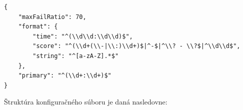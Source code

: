 \begin{lstlisting}[caption={Príklad konfiguračného súboru},captionpos=b,label={config_ex}]
{
    "maxFailRatio": 70,
    "format": {
        "time": "^(\\d\\d:\\d\\d)$",
        "score": "^(\\d+(\\-|\\:)\\d+)$|^-$|^\\? - \\?$|^\\d\\d$",
        "string": "^[a-zA-Z].*$"
    },
    "primary": "^(\\d+:\\d+)$"
}
\end{lstlisting}

\bigskip

Štruktúra konfiguračného súboru je daná nasledovne:

